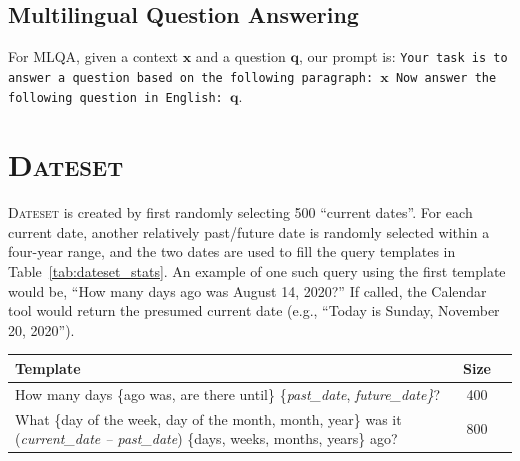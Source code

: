 \documentclass[11pt]{article}
\begin{document}
\begin{CJK*}{UTF8}{gbsn}
\subsection{Multilingual Question Answering}

For MLQA, given a context $\mathbf{x}$ and a question $\mathbf{q}$, our prompt is: \texttt{Your task is to answer a question based on the following paragraph: $\mathbf{x}$ Now answer the following question in English: $\mathbf{q}$}.

\section{\textsc{Dateset}}
\label{sec:dateset}
\textsc{Dateset} is created by first randomly selecting 500 ``current dates''. For each current date, another relatively past/future date is randomly selected within a four-year range, and the two dates are used to fill the query templates in Table~\ref{tab:dateset_stats}. An example of one such query using the first template would be, ``How many days ago was August 14, 2020?'' If called, the Calendar tool would return the presumed current date (e.g., ``Today is Sunday, November 20, 2020''). 

\def\arraystretch{1.5}
\begin{table}
    \centering
    \small
    \setlength{\tabcolsep}{5pt}
    \begin{tabularx}{\linewidth}{Xcc}
        \toprule
        \textbf{Template} & \textbf{Size}\\
        \midrule     
        How many days \{ago was, are there until\} \{\textit{past\_date}, \textit{future\_date\}}?  & \phantom{00,}400\\
        
        What \{day of the week, day of the month, month, year\} was it (\textit{current\_date -- past\_date}) \{days, weeks, months, years\} ago?  & \phantom{00,}800\\


\end{tabularx}
\end{table}
\end{CJK*}
\end{document}
